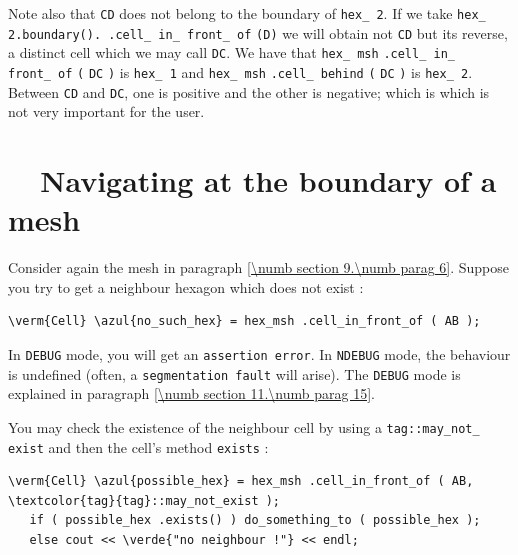 Note also that {\small\tt CD} does not belong to the boundary of {\small\tt hex\_\,2}.
If we take {\small\tt hex\_\,2.boundary(). .cell\_\,in\_\,front\_\,of} {\small\tt (D)}
we will obtain not {\small\tt CD} but its reverse, a distinct cell which we may call {\small\tt DC}.
We have that {\small\tt hex\_\,msh} {\small\tt .cell\_\,in\_\,front\_\,of} {\small\tt (}
{\small\tt DC} {\small\tt )} is {\small\tt hex\_\,1} and {\small\tt hex\_\,msh}
{\small\tt .cell\_\,behind} {\small\tt (} {\small\tt DC} {\small\tt )} is {\small\tt hex\_\,2}.
Between {\small\tt CD} and {\small\tt DC}, one is positive and the other is negative;
which is which is not very important for the user.


\section{~~Navigating at the boundary of a mesh}\label{\numb section 9.\numb parag 7}

Consider again the mesh in paragraph \ref{\numb section 9.\numb parag 6}.
Suppose you try to get a neighbour hexagon which does not exist :

\begin{Verbatim}[commandchars=\\\{\},formatcom=\small\tt,
   baselinestretch=0.94,framesep=2mm                      ]
   \verm{Cell} \azul{no_such_hex} = hex_msh .cell_in_front_of ( AB );
\end{Verbatim}

In {\small\tt DEBUG} mode, you will get an {\small\tt assertion error}.
In {\small\tt NDEBUG} mode, the behaviour is undefined
(often, a {\small\tt segmentation fault} will arise).
The {\small\tt DEBUG} mode is explained in paragraph \ref{\numb section 11.\numb parag 15}.

You may check the existence of the neighbour cell by using a
{\small\tt \textcolor{tag}{tag}::may\_\;not\_\,exist} and then the cell's method {\small\tt exists} :

\begin{Verbatim}[commandchars=\\\{\},formatcom=\small\tt,
   baselinestretch=0.94,framesep=2mm                      ]
   \verm{Cell} \azul{possible_hex} = hex_msh .cell_in_front_of ( AB, \textcolor{tag}{tag}::may_not_exist );
   if ( possible_hex .exists() ) do_something_to ( possible_hex );
   else cout << \verde{"no neighbour !"} << endl;
\end{Verbatim}

